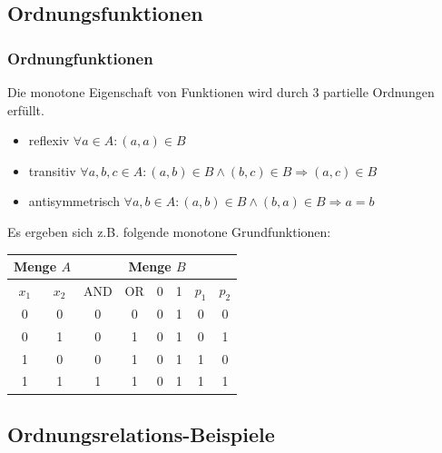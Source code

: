 \documentclass[hyperref={pdfpagelabels=false}]{beamer} %
\begin{document}
  \subsection{Ordnungsfunktionen}
  \begin{frame}%
    \frametitle{Ordnungfunktionen}
    Die monotone Eigenschaft von Funktionen wird durch 3 partielle Ordnungen erfüllt.
    \begin{itemize}
      \item reflexiv $\forall a \in A: (a,a) \in B$\\
      \item transitiv $\forall a,b,c \in A: (a,b) \in B \land (b,c) \in B \Rightarrow (a,c) \in B$\\
      \item antisymmetrisch $\forall a,b \in A: (a,b) \in B \land (b,a) \in B \Rightarrow a=b$\\
    \end{itemize}
    Es ergeben sich z.B. folgende monotone Grundfunktionen:\\
    \begin{tabular}[t]{|cc|c|c|c|c|c|c|} \hline
      \multicolumn{2}{|c|}{Menge $A$} & \multicolumn{6}{|c|}{Menge $B$} \\ \hline
      $x_1$	& $x_2$	& AND	& OR	& 0	& 1	& $p_1$	& $p_2$\\ \hline
      0	        & 0	& 0	& 0	& 0	& 1	& 0	& 0\\
      0	        & 1	& 0	& 1	& 0	& 1	& 0	& 1\\
      1	        & 0	& 0	& 1	& 0	& 1	& 1	& 0\\
      1	        & 1	& 1	& 1	& 0	& 1	& 1	& 1\\ \hline
    \end{tabular}
  \end{frame}

  \subsection{Ordnungsrelations-Beispiele}
\end{document}
